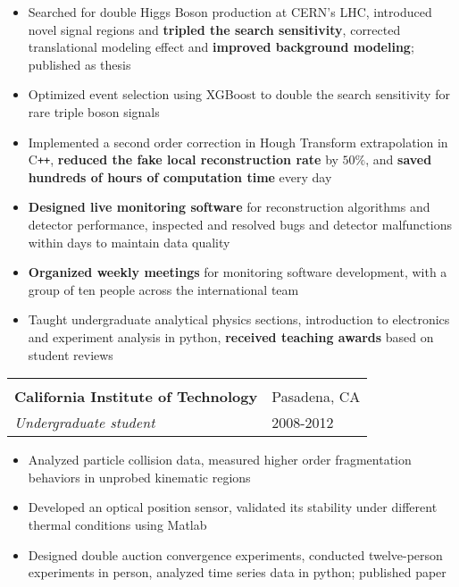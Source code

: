 \documentclass[letterpaper,11pt,oneside]{article}
\begin{document}
 \begin{flushleft}
  \begin{small}
 \begin{itemize}[leftmargin=*]
  \item Searched for double Higgs Boson production at CERN's LHC, introduced novel signal regions and \textbf{tripled the search sensitivity}, corrected translational modeling effect and \textbf{improved background modeling}; published as thesis
  \item Optimized event selection using XGBoost to double the search sensitivity for rare triple boson signals
  \item Implemented a second order correction in Hough Transform extrapolation in C\texttt{++}, \textbf{reduced the fake local reconstruction rate} by $50\%$, and \textbf{saved hundreds of hours of computation time} every day
   \item\textbf{Designed live monitoring software} for reconstruction algorithms and detector performance, inspected and resolved bugs and detector malfunctions within days to maintain data quality
  \item \textbf{Organized weekly meetings} for monitoring software development, with a group of ten people across the international team
  \item Taught undergraduate analytical physics sections, introduction to electronics and experiment analysis in python, \textbf{received teaching awards} based on student reviews
 \end{itemize}
  \end{small}
 \end{flushleft}
 \begin{flushleft}
 \vspace{-0.25cm}
 \begin{tabular}{@{} l l }
    \hspace{0.8\linewidth} & \hspace{0.1\linewidth} \\
    \textbf{California Institute of Technology} & Pasadena, CA \\ 
    \textit{Undergraduate student} & 2008-2012 \\ 
 \end{tabular}
 \end{flushleft}
 \begin{flushleft}
  \begin{small}
 \begin{itemize}[leftmargin=*]
 \item Analyzed particle collision data, measured higher order fragmentation behaviors in unprobed kinematic regions
 \item Developed an optical position sensor, validated its stability under different thermal conditions using Matlab
 \item Designed double auction convergence experiments, conducted twelve-person experiments in person, analyzed time series data in python; published paper
 \end{itemize}
  \end{small}
 \end{flushleft}
\end{document}
